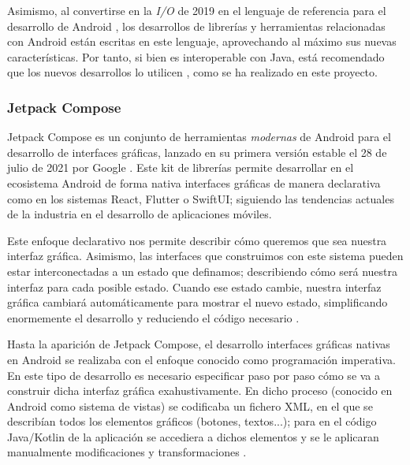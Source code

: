             Asimismo, al convertirse en la \textit{I/O} de 2019 en el lenguaje de referencia para el desarrollo 
            de Android \cite{braun_celebrating_2022}, los desarrollos de librerías y herramientas relacionadas con 
            Android están escritas en este lenguaje, aprovechando al máximo sus nuevas características. Por tanto, si
            bien es interoperable con Java, está recomendado que los nuevos desarrollos lo utilicen 
            \cite{lardinois_kotlin_2019}, como se ha realizado en este proyecto.
            
        \subsubsection{Jetpack Compose}

            Jetpack Compose es un conjunto de herramientas \textit{modernas} de Android para el desarrollo de 
            interfaces gráficas, lanzado en su primera versión estable el 28 de julio de 2021 por Google
            \cite{bellini_jetpack_2021}. Este kit de librerías permite desarrollar en el ecosistema Android de 
            forma nativa interfaces gráficas de manera declarativa como en los sistemas React, Flutter o SwiftUI;
            siguiendo las tendencias actuales de la industria en el desarrollo de aplicaciones móviles. 

            Este enfoque declarativo nos permite describir cómo queremos que sea nuestra interfaz gráfica. 
            Asimismo, las interfaces que construimos con este sistema pueden estar interconectadas a un estado 
            que definamos; describiendo cómo será nuestra interfaz para cada posible estado. Cuando ese estado cambie, 
            nuestra interfaz gráfica cambiará automáticamente para mostrar el nuevo estado, simplificando enormemente 
            el desarrollo y reduciendo el código necesario \cite{leiva_que_2021}. 

            Hasta la aparición de Jetpack Compose, el desarrollo interfaces gráficas nativas en Android se realizaba 
            con el enfoque conocido como programación imperativa. En este tipo de desarrollo es necesario especificar 
            paso por paso cómo se va a construir dicha interfaz gráfica exahustivamente. En dicho proceso (conocido 
            en Android como sistema de vistas) se codificaba un fichero XML, en el que se describían todos los 
            elementos gráficos (botones, textos...); para en el código Java/Kotlin de la aplicación se accediera 
            a dichos elementos y se le aplicaran manualmente modificaciones y transformaciones 
            \cite{noauthor_programacion_2021}. 

